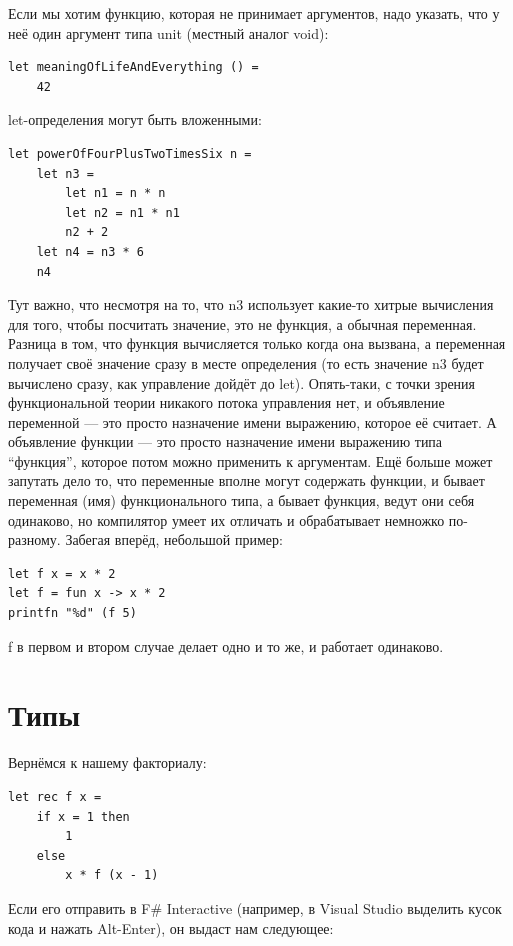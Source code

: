 \documentclass[a5paper]{article}
\begin{document}
Если мы хотим функцию, которая не принимает аргументов, надо указать, что у неё один аргумент типа unit (местный аналог void):

\begin{verbatim}
let meaningOfLifeAndEverything () =
    42
\end{verbatim}

let-определения могут быть вложенными:
\begin{verbatim}
let powerOfFourPlusTwoTimesSix n =
    let n3 =
        let n1 = n * n
        let n2 = n1 * n1
        n2 + 2
    let n4 = n3 * 6
    n4
\end{verbatim}

Тут важно, что несмотря на то, что n3 использует какие-то хитрые вычисления для того, чтобы посчитать значение, это не функция, а обычная переменная. Разница в том, что функция вычисляется только когда она вызвана, а переменная получает своё значение сразу в месте определения (то есть значение n3 будет вычислено сразу, как управление дойдёт до let). Опять-таки, с точки зрения функциональной теории никакого потока управления нет, и объявление переменной --- это просто назначение имени выражению, которое её считает. А объявление функции --- это просто назначение имени выражению типа ``функция'', которое потом можно применить к аргументам. Ещё больше может запутать дело то, что переменные вполне могут содержать функции, и бывает переменная (имя) функционального типа, а бывает функция, ведут они себя одинаково, но компилятор умеет их отличать и обрабатывает немножко по-разному. Забегая вперёд, небольшой пример:

\begin{verbatim}
let f x = x * 2
let f = fun x -> x * 2
printfn "%d" (f 5)
\end{verbatim}

f в первом и втором случае делает одно и то же, и работает одинаково.

\section{Типы}

Вернёмся к нашему факториалу:

\begin{verbatim}
let rec f x =
    if x = 1 then
        1
    else
        x * f (x - 1)
\end{verbatim}

Если его отправить в F\# Interactive (например, в Visual Studio выделить кусок кода и нажать Alt-Enter), он выдаст нам следующее:
\end{document}
